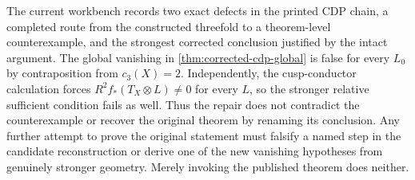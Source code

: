 \begin{test}\label{test:cdp-comparison}
The current workbench records two exact defects in the printed CDP chain, a
completed route from the constructed threefold to a theorem-level
counterexample, and the strongest corrected conclusion justified by the
intact argument.  The global vanishing in
\cref{thm:corrected-cdp-global} is false for every \(L_0\) by contraposition
from \(c_3(X)=2\).  Independently, the cusp-conductor calculation forces
\(R^2f_*(T_X\otimes L)\ne0\) for every \(L\), so the stronger relative
sufficient condition fails as well.  Thus the repair does not contradict the
counterexample or recover the original
theorem by renaming its conclusion.  Any further attempt to prove the
original statement must falsify a named step in the candidate reconstruction
or derive one of the new vanishing hypotheses from genuinely stronger
geometry.  Merely invoking the published theorem does neither.
\end{test}
